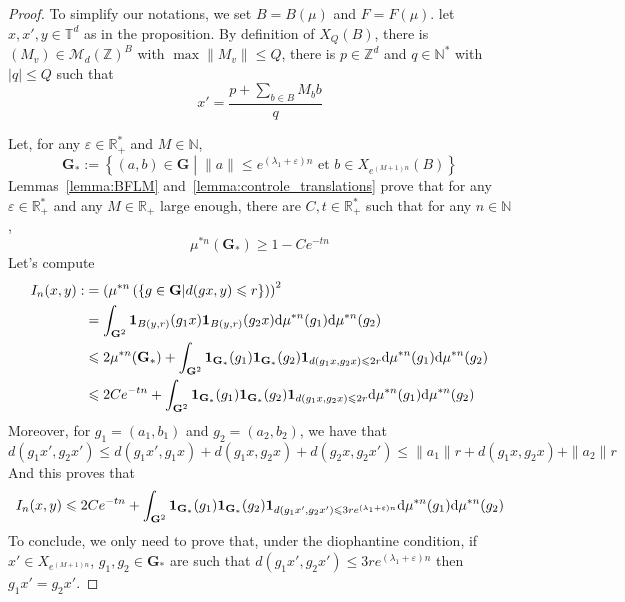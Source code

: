\documentclass[11pt]{amsart}
\theoremstyle{definition}
\theoremstyle{remark}
\numberwithin{equation}{section}
\begin{document}
\begin{proof}To simplify our notations, we set $B= B(\mu)$ and $F=F(\mu)$. 
let $x,x',y\in {\mathbb T}^d$ as in the proposition. By definition of $X_Q(B)$, there is $(M_v)\in \mathcal{M}_d({\mathbb Z}) ^{B}$ with $\max \|M_v\| \leqslant Q$, there is $p\in {\mathbb Z}^d$ and $q\in {\mathbb N}^\ast$ with $|q|\leqslant Q$ such that
\[
x' = \frac {p+ \sum_{b\in B} M_b b}q
\]

Let, for any $\varepsilon \in {\mathbb R}_+^\ast$ and $M\in {\mathbb N}$,
\[
{\mathbf G}_\ast:= \left\{ (a,b) \in {\mathbf G}\middle| \|a\|\leqslant e^{(\lambda_1 + \varepsilon)n} \text{ et }b\in X_{e^{(M+1)n}}(B)\right\}
\]
Lemmas~\ref{lemma:BFLM} and~\ref{lemma:controle_translations} prove that for any $\varepsilon \in {\mathbb R}_+^\ast$ and any $M\in {\mathbb R}_+$ large enough, there are $C,t\in {\mathbb R}_+^\ast$ such that for any $n\in {\mathbb N}$,
\[
\mu^{\ast n}({\mathbf G}_\ast) \geqslant 1-Ce^{-tn}
\]
Let's compute
\begin{align*}
I_n(x,y):&=\left(\mu^{\ast n}\left(\left\{ g\in {\mathbf G}\middle| d(gx,y) \leqslant r\right\}\right) \right)^2 \\&= \int_{{\mathbf G}^2} {\mathbf{1}}_{B(y,r)}(g_1 x) {\mathbf{1}}_{B(y,r)} (g_2 x) {{\rm d}}\mu^{\ast n}(g_1) {{\rm d}}\mu^{\ast n}(g_2) \\
& \leqslant 2\mu^{\ast n}({\mathbf G}_\ast) + \int_{{\mathbf G}^2} {\mathbf{1}}_{{\mathbf G}_\ast}(g_1){\mathbf{1}}_{{\mathbf G}_\ast}(g_2) {\mathbf{1}}_{d(g_1x,g_2x)\leqslant 2r} {{\rm d}}\mu^{\ast n}(g_1) {{\rm d}}\mu^{\ast n}(g_2) \\
& \leqslant 2Ce^{-tn} + \int_{{\mathbf G}^2} {\mathbf{1}}_{{\mathbf G}_\ast}(g_1){\mathbf{1}}_{{\mathbf G}_\ast}(g_2) {\mathbf{1}}_{d(g_1x,g_2x)\leqslant 2r} {{\rm d}}\mu^{\ast n}(g_1) {{\rm d}}\mu^{\ast n}(g_2)
\end{align*}
Moreover, for $g_1 = (a_1,b_1)$ and $g_2=(a_2,b_2)$, we have that
\[
d(g_1 x',g_2 x')\leqslant d(g_1 x',g_1 x) + d(g_1x,g_2 x) + d(g_2 x,g_2 x') \leqslant \|a_1\| r + d(g_1 x,g_2 x) + \|a_2\|r
\]
And this proves that
\[
I_n(x,y) \leqslant 2 Ce^{-tn} + \int_{{\mathbf G}^2}{\mathbf{1}}_{{\mathbf G}_\ast}(g_1){\mathbf{1}}_{{\mathbf G}_\ast}(g_2) {\mathbf{1}}_{d(g_1x',g_2x')\leqslant 3re^{(\lambda_1 + \varepsilon)n}} {{\rm d}}\mu^{\ast n}(g_1) {{\rm d}}\mu^{\ast n}(g_2)
\]
To conclude, we only need to prove that, under the diophantine condition, if $x'\in X_{e^{(M+1)n}}$, $g_1,g_2\in {\mathbf G}_\ast$ are such that $d(g_1 x',g_2 x') \leqslant 3re^{(\lambda_1+ \varepsilon)n}$ then $g_1 x'=g_2 x'$.


\end{proof}
\end{document}
